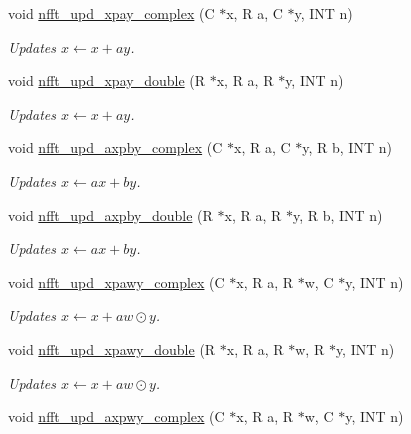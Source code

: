 \begin{DoxyCompactItemize}
void \hyperlink{group__nfftutil_ga6c9f09e54d57b4f85a5533e7a271133d}{nfft\-\_\-upd\-\_\-xpay\-\_\-complex} (C $\ast$x, R a, C $\ast$y, I\-N\-T n)
\begin{DoxyCompactList}\small\item\em Updates $x \leftarrow x + a y$. \end{DoxyCompactList}\item 
void \hyperlink{group__nfftutil_gac340fb9c1e5ab1a7060ad418590bc586}{nfft\-\_\-upd\-\_\-xpay\-\_\-double} (R $\ast$x, R a, R $\ast$y, I\-N\-T n)
\begin{DoxyCompactList}\small\item\em Updates $x \leftarrow x + a y$. \end{DoxyCompactList}\item 
void \hyperlink{group__nfftutil_gac52805b6e99ef2d83bcdcb0804a15237}{nfft\-\_\-upd\-\_\-axpby\-\_\-complex} (C $\ast$x, R a, C $\ast$y, R b, I\-N\-T n)
\begin{DoxyCompactList}\small\item\em Updates $x \leftarrow a x + b y$. \end{DoxyCompactList}\item 
void \hyperlink{group__nfftutil_ga3ac1abfac87bda56f00b39254aa83f20}{nfft\-\_\-upd\-\_\-axpby\-\_\-double} (R $\ast$x, R a, R $\ast$y, R b, I\-N\-T n)
\begin{DoxyCompactList}\small\item\em Updates $x \leftarrow a x + b y$. \end{DoxyCompactList}\item 
void \hyperlink{group__nfftutil_gaaa82b892bd26ed940e7f0138f47a9607}{nfft\-\_\-upd\-\_\-xpawy\-\_\-complex} (C $\ast$x, R a, R $\ast$w, C $\ast$y, I\-N\-T n)
\begin{DoxyCompactList}\small\item\em Updates $x \leftarrow x + a w\odot y$. \end{DoxyCompactList}\item 
void \hyperlink{group__nfftutil_gab1de8878b4b8e5016d0ec115e76b1941}{nfft\-\_\-upd\-\_\-xpawy\-\_\-double} (R $\ast$x, R a, R $\ast$w, R $\ast$y, I\-N\-T n)
\begin{DoxyCompactList}\small\item\em Updates $x \leftarrow x + a w\odot y$. \end{DoxyCompactList}\item 
void \hyperlink{group__nfftutil_ga1a7d3fc56e776544d61c1ba16ff503ab}{nfft\-\_\-upd\-\_\-axpwy\-\_\-complex} (C $\ast$x, R a, R $\ast$w, C $\ast$y, I\-N\-T n)

\end{DoxyCompactItemize}
